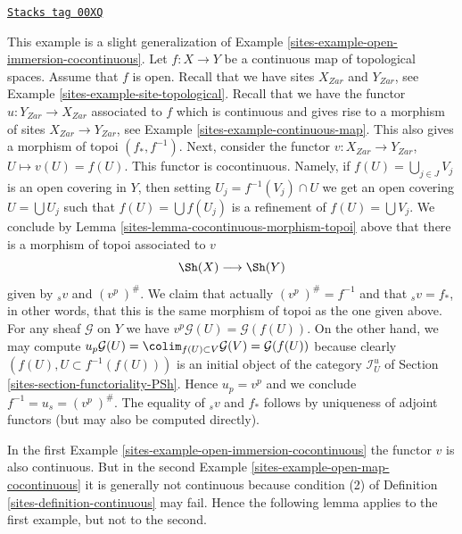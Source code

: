 \begin{example}
\label{sites-example-open-map-cocontinuous}
\href{https://stacks.math.columbia.edu/tag/00XQ}{\texttt{Stacks tag 00XQ}}

This example is a slight generalization of
Example \ref{sites-example-open-immersion-cocontinuous}.
Let $f : X \to Y$ be a continuous map of topological spaces.
Assume that $f$ is open.
Recall that we have sites $X_{Zar}$ and $Y_{Zar}$,
see Example \ref{sites-example-site-topological}.
Recall that we have the functor $u : Y_{Zar} \to X_{Zar}$
associated to $f$ which is continuous and gives rise
to a morphism of sites $X_{Zar} \to Y_{Zar}$,
see Example \ref{sites-example-continuous-map}.
This also gives a morphism of topoi $(f_*, f^{-1})$.
Next, consider the functor
$v : X_{Zar} \to Y_{Zar}$, $U \mapsto v(U) = f(U)$.
This functor is cocontinuous. Namely, if $f(U) = \bigcup_{j \in J} V_j$
is an open covering in $Y$, then setting $U_j = f^{-1}(V_j) \cap U$
we get an open covering $U = \bigcup U_j$ such that $f(U) = \bigcup f(U_j)$
is a refinement of $f(U) = \bigcup V_j$.
We conclude by Lemma \ref{sites-lemma-cocontinuous-morphism-topoi} above
that there is a morphism of topoi associated to $v$
$$
\Sh(X) \longrightarrow \Sh(Y)
$$
given by ${}_sv$ and $(v^p\ )^\#$. We claim that
actually $(v^p\ )^\# = f^{-1}$ and that ${}_sv = f_*$,
in other words, that this is the same morphism of topoi
as the one given above. For any sheaf
$\mathcal{G}$ on $Y$ we have
$v^p\mathcal{G}(U) = \mathcal{G}(f(U))$.
On the other hand, we may compute
$u_p\mathcal{G}(U) = \colim_{f(U) \subset V} \mathcal{G}(V)
= \mathcal{G}(f(U))$ because clearly $(f(U), U \subset f^{-1}(f(U)))$
is an initial object of the category $\mathcal{I}_U^u$ of
Section \ref{sites-section-functoriality-PSh}.
Hence $u_p = v^p$ and we conclude $f^{-1} = u_s = (v^p\ )^\#$.
The equality of ${}_sv$ and $f_*$ follows by
uniqueness of adjoint functors (but may also be computed directly).
\end{example}

In the first Example \ref{sites-example-open-immersion-cocontinuous}
the functor $v$ is also continuous. But in the second
Example \ref{sites-example-open-map-cocontinuous} it is generally not continuous
because condition (2) of Definition \ref{sites-definition-continuous} may fail.
Hence the following lemma applies to the first example, but not to the second.


